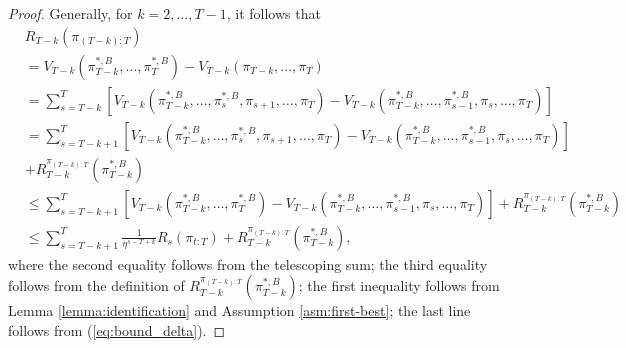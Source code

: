 \begin{proof}
Generally, for $k=2,\ldots,T-1$, it follows that
\begin{align*}
    &R_{T-k}\left(\pi_{(T-k):T}\right) \\
    &= V_{T-k}\left(\pi_{T-k}^{\ast,B},\ldots,\pi_{T}^{\ast,B}\right) - V_{T-k}\left(\pi_{T-k},\ldots,\pi_{T}\right) \\ &=\sum_{s=T-k}^{T}\left[V_{T-k}\left(\pi_{T-k}^{\ast,B},\ldots,\pi_{s}^{\ast,B},\pi_{s+1},\ldots,\pi_{T}\right) - V_{T-k}\left(\pi_{T-k}^{\ast,B},\ldots,\pi_{s-1}^{\ast,B},\pi_{s},\ldots,\pi_{T}\right)\right] \\
    &=\sum_{s=T-k+1}^{T}\left[V_{T-k}\left(\pi_{T-k}^{\ast,B},\ldots,\pi_{s}^{\ast,B},\pi_{s+1},\ldots,\pi_{T}\right) - V_{T-k}\left(\pi_{T-k}^{\ast,B},\ldots,\pi_{s-1}^{\ast,B},\pi_{s},\ldots,\pi_{T}\right)\right]  \\
    &+ R_{T-k}^{\pi_{(T-k):T}}(\pi_{T-k}^{\ast,B})\\
    &\leq \sum_{s=T-k+1}^{T}\left[V_{T-k}\left(\pi_{T-k}^{\ast,B},\ldots,\pi_{T}^{\ast,B}\right) - V_{T-k}\left(\pi_{T-k}^{\ast,B},\ldots,\pi_{s-1}^{\ast,B},\pi_{s},\ldots,\pi_{T}\right)\right] + R_{T-k}^{\pi_{(T-k):T}}(\pi_{T-k}^{\ast,B})\\
    &\leq \sum_{s=T-k+1}^{T}\frac{1}{\eta^{s-T+k}} R_{s}\left(\pi_{t:T}\right)+ R_{T-k}^{\pi_{(T-k):T}}(\pi_{T-k}^{\ast,B}),
\end{align*}
where the second equality follows from the telescoping sum; the third equality follows from the definition of $R_{T-k}^{\pi_{(T-k):T}}(\pi_{T-k}^{\ast,B})$; the first inequality follows from Lemma \ref{lemma:identification} and Assumption \ref{asm:first-best}; the last line follows from (\ref{eq:bound_delta}).


\end{proof}
